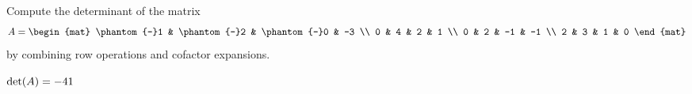 
\begin{Exercise}[
name={},
title={},
difficulty=0,
origin={\cite{MB}}]
Compute the determinant of the matrix
$$ 
A= \begin{mat}
\phantom{-}1 & \phantom{-}2 & \phantom{-}0  & -3  \\ 
0 & 4 & 2 & 1 \\ 
0 & 2 & -1 & -1 \\
2 & 3 & 1 & 0
\end{mat}$$
by combining row operations and cofactor expansions.
\end{Exercise}

\begin{Answer}
$
\operatorname{det}(A) = -41
$
\end{Answer}

